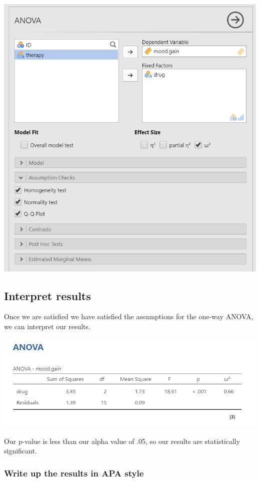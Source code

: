 \documentclass[
]{book}
\begin{document}
\includegraphics{images/04_one-way-anova/one-way_setup.png}

\hypertarget{interpret-results-4}{%
\subsection{Interpret results}\label{interpret-results-4}}

Once we are satisfied we have satisfied the assumptions for the one-way ANOVA, we can interpret our results.

\includegraphics{images/04_one-way-anova/one-way_results.png}

Our p-value is less than our alpha value of .05, so our results are statistically significant.

\hypertarget{write-up-the-results-in-apa-style-6}{%
\subsubsection{Write up the results in APA style}\label{write-up-the-results-in-apa-style-6}}
\end{document}
